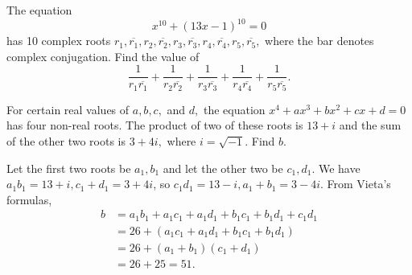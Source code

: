 %
%	
%
%
%
%






\begin{question}[name={1994 AIME, \href{https://artofproblemsolving.com/community/c4p394743}{Problem 13}}]
	The equation\[ x^{10}+(13x-1)^{10}=0 \]has 10 complex roots $r_1, \overline{r_1}, r_2, \overline{r_2}, r_3, \overline{r_3}, r_4, \overline{r_4}, r_5, \overline{r_5},$ where the bar denotes complex conjugation. Find the value of\[ \frac 1{r_1\overline{r_1}}+\frac 1{r_2\overline{r_2}}+\frac 1{r_3\overline{r_3}}+\frac 1{r_4\overline{r_4}}+\frac 1{r_5\overline{r_5}}. \]
\end{question}

%
%	
%
%











\begin{question}[name={1995 AIME, \href{https://artofproblemsolving.com/community/c4p394478}{Problem 5}}]
	For certain real values of $a, b, c,$ and $d,$ the equation $x^4+ax^3+bx^2+cx+d=0$ has four non-real roots. The product of two of these roots is $13+i$ and the sum of the other two roots is $3+4i,$ where $i=\sqrt{-1}.$ Find $b.$	
\end{question}


\begin{solution}[name={Solution by OlympusHero}]
	Let the first two roots be $a_1, b_1$ and let the other two be $c_1, d_1$. We have $a_1b_1=13+i, c_1+d_1=3+4i$, so $c_1d_1=13-i, a_1+b_1=3-4i$. From Vieta's formulas,
	\begin{align*}
		b &= a_1b_1+a_1c_1+a_1d_1+b_1c_1+b_1d_1+c_1d_1\\
		&= 26+(a_1c_1+a_1d_1+b_1c_1+b_1d_1)\\
		&= 26+(a_1+b_1)(c_1+d_1)\\
		&= 26+25=\boxed{51}.
	\end{align*}
\end{solution}












